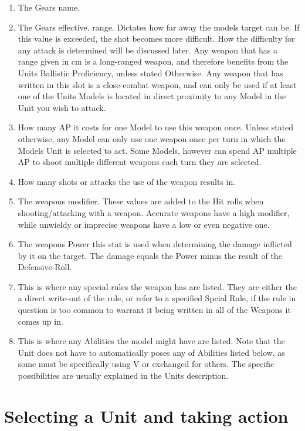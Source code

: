 \documentclass[a4paper,12pt]{book}
\begin{document}
\begin{adjustwidth}{-2cm}{-2cm}
\begin{multicols}{2}
\begin{enumerate}
	\item The Gears name.
	\item The Gears effective. range. Dictates how far away the models target can be. If this value is  exceeded, the shot becomes more difficult. How the difficulty for any attack is determined will be discussed later. Any weapon that has a range given in cm is a long-ranged weapon, and therefore benefits from the Units Ballistic Proficiency, unless stated Otherwise. Any weapon that has  written in this slot is a close-combat weapon, and can only be used if at least one of the Units Models is located in direct proximity to any Model in the Unit you wish to attack.
	\item How many AP it costs for one Model to use this weapon once. Unless stated otherwise, any Model can only use one weapon once per turn in which the Models Unit is selected to act. Some Models, however can spend AP multiple AP to shoot multiple different weapons each turn they are selected.
	\item How many shots or attacks the use of the weapon results in.
	\item The weapons modifier. These values are added to the Hit rolls when shooting/attacking with a weapon. Accurate weapons have a high modifier, while unwieldy or imprecise weapons have a low or even negative one.
	\item The weapons Power this stat is used when determining the damage inflicted by it on the target. The damage equals the Power minus the result of the Defensive-Roll.
	\item This is where any special rules the weapon has are listed. They are either the a direct write-out of the rule, or refer to a specified Spcial Rule, if the rule in question is too common to warrant it being written in all of the Weapons it comes up in.
	\item This is where any Abilities the model might have are listed. Note that the Unit does not have to automatically poses any of Abilities listed below, as some must be specifically  using V or exchanged for others. The specific possibilities are usually explained in the Units description.
	
\end{enumerate}
\end{multicols}
\end{adjustwidth}



\section{Selecting a Unit and taking action}
\end{document}
